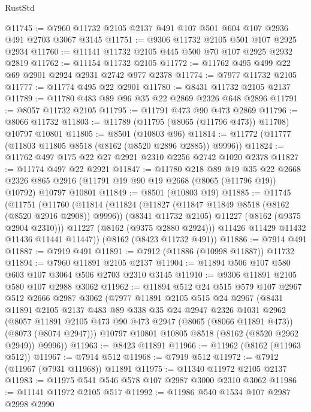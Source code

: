 \begin{lexlean}{RustStd}
\begin{coremodule}
@11745 := @7960 @11732 @2105 @2137 @491 @107 @501 @604 @107 @2936 @491 @2703 @3067 @3145
@11751 := @9306 @11732 @2105 @501 @107 @2925 @2934
@11760 := @11141 @11732 @2105 @445 @500 @70 @107 @2925 @2932 @2819
@11762 := @11154 @11732 @2105
@11772 := @11762 @495 @499 @22 @69 @2901 @2924 @2931 @2742 @977 @2378
@11774 := @7977 @11732 @2105
@11777 := @11774 @495 @22 @2901
@11780 := @8431 @11732 @2105 @2137
@11789 := @11780 @483 @89 @96 @35 @22 @2869 @2326 @648 @2896
@11791 := @8057 @11732 @2105
@11795 := @11791 @473 @90 @473 @2869
@11796 := @8066 @11732
@11803 := @11789 (@11795 (@8065 (@11796 @473)) @11708) @10797 @10801
@11805 := @8501 (@10803 @96)
@11814 := @11772 (@11777 (@11803 @11805 @8518 (@8162 (@8520 @2896 @2885)) @9996))
@11824 := @11762 @497 @175 @22 @27 @2921 @2310 @2256 @2742 @1020 @2378
@11827 := @11774 @497 @22 @2921
@11847 := @11780
    @218
    @89
    @19
    @35
    @22
    @2668
    @2326
    @865
    @2916
    (@11791 @19 @90 @19 @2668 (@8065 (@11796 @19)) @10792)
    @10797
    @10801
@11849 := @8501 (@10803 @19)
@11885 := @11745
    (@11751
      (@11760
        (@11814
          (@11824
            (@11827 (@11847 @11849 @8518 (@8162 (@8520 @2916 @2908)) @9996))
            (@8341 @11732 @2105)
            @11227
            (@8162 (@9375 @2904 @2310)))
          @11227
          (@8162 (@9375 @2880 @2924)))
        @11426
        @11429
        @11432
        @11436
        @11441
        @11447))
    (@8162 (@8423 @11732 @491))
@11886 := @7914 @491
@11887 := @7919 @491
@11891 := @7912 (@11886 (@10998 @11887)) @11732
@11894 := @7960 @11891 @2105 @2137
@11904 := @11894 @506 @107 @580 @603 @107 @3064 @506 @2703 @2310 @3145
@11910 := @9306 @11891 @2105 @580 @107 @2988 @3062
@11962 := @11894
    @512
    @24
    @515
    @579
    @107
    @2967
    @512
    @2666
    @2987
    @3062
    (@7977
      @11891
      @2105
      @515
      @24
      @2967
      (@8431
        @11891
        @2105
        @2137
        @483
        @89
        @338
        @35
        @24
        @2947
        @2326
        @1031
        @2962
        (@8057 @11891 @2105 @473 @90 @473 @2947 (@8065 (@8066 @11891 @473)) (@8073 (@8074 @2947)))
        @10797
        @10801
        @10805
        @8518
        (@8162 (@8520 @2962 @2949))
        @9996))
@11963 := @8423 @11891
@11966 := @11962 (@8162 (@11963 @512))
@11967 := @7914 @512
@11968 := @7919 @512
@11972 := @7912 (@11967 (@7931 @11968)) @11891
@11975 := @11340 @11972 @2105 @2137
@11983 := @11975 @541 @546 @578 @107 @2987 @3000 @2310 @3062
@11986 := @11141 @11972 @2105 @517
@11992 := @11986 @540 @1534 @107 @2987 @2998 @2990

\end{coremodule}
\end{lexlean}
